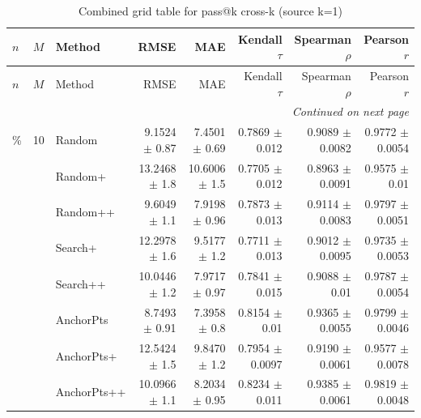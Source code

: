 \footnotesize
\setlength{\tabcolsep}{2pt}
\renewcommand{\arraystretch}{1.05}
\setlength{\LTpre}{0pt}
\setlength{\LTpost}{0pt}
\setlength{\LTleft}{\fill}
\setlength{\LTright}{\fill}
\begin{longtable}{llp{}rrrrr}
\caption{Combined grid table for pass@k cross-k (source k=1)}\label{tab:combined\_grid\_passk\_k1}\\
\toprule
$n$ & $M$ & Method & RMSE & MAE & Kendall $\tau$ & Spearman $\rho$ & Pearson $r$ \\
\midrule
\endfirsthead
\toprule
$n$ & $M$ & Method & RMSE & MAE & Kendall $\tau$ & Spearman $\rho$ & Pearson $r$ \\
\midrule
\endhead
\midrule
\multicolumn{8}{r}{\emph{Continued on next page}} \\
\midrule
\endfoot
\bottomrule
\endlastfoot
5\% & 10 & Random & 9.1524 {\scriptsize $\pm$ 0.87} & 7.4501 {\scriptsize $\pm$ 0.69} & 0.7869 {\scriptsize $\pm$ 0.012} & 0.9089 {\scriptsize $\pm$ 0.0082} & 0.9772 {\scriptsize $\pm$ 0.0054} \\
 &  & Random+ & 13.2468 {\scriptsize $\pm$ 1.8} & 10.6006 {\scriptsize $\pm$ 1.5} & 0.7705 {\scriptsize $\pm$ 0.012} & 0.8963 {\scriptsize $\pm$ 0.0091} & 0.9575 {\scriptsize $\pm$ 0.01} \\
 &  & Random++ & 9.6049 {\scriptsize $\pm$ 1.1} & 7.9198 {\scriptsize $\pm$ 0.96} & 0.7873 {\scriptsize $\pm$ 0.013} & 0.9114 {\scriptsize $\pm$ 0.0083} & 0.9797 {\scriptsize $\pm$ 0.0051} \\
 &  & Search+ & 12.2978 {\scriptsize $\pm$ 1.6} & 9.5177 {\scriptsize $\pm$ 1.2} & 0.7711 {\scriptsize $\pm$ 0.013} & 0.9012 {\scriptsize $\pm$ 0.0095} & 0.9735 {\scriptsize $\pm$ 0.0053} \\
 &  & Search++ & 10.0446 {\scriptsize $\pm$ 1.2} & 7.9717 {\scriptsize $\pm$ 0.97} & 0.7841 {\scriptsize $\pm$ 0.015} & 0.9088 {\scriptsize $\pm$ 0.01} & 0.9787 {\scriptsize $\pm$ 0.0054} \\
 &  & AnchorPts & 8.7493 {\scriptsize $\pm$ 0.91} & 7.3958 {\scriptsize $\pm$ 0.8} & 0.8154 {\scriptsize $\pm$ 0.01} & 0.9365 {\scriptsize $\pm$ 0.0055} & 0.9799 {\scriptsize $\pm$ 0.0046} \\
 &  & AnchorPts+ & 12.5424 {\scriptsize $\pm$ 1.5} & 9.8470 {\scriptsize $\pm$ 1.2} & 0.7954 {\scriptsize $\pm$ 0.0097} & 0.9190 {\scriptsize $\pm$ 0.0061} & 0.9577 {\scriptsize $\pm$ 0.0078} \\
 &  & AnchorPts++ & 10.0966 {\scriptsize $\pm$ 1.1} & 8.2034 {\scriptsize $\pm$ 0.95} & 0.8234 {\scriptsize $\pm$ 0.011} & 0.9385 {\scriptsize $\pm$ 0.0061} & 0.9819 {\scriptsize $\pm$ 0.0048} \\

\end{longtable}
